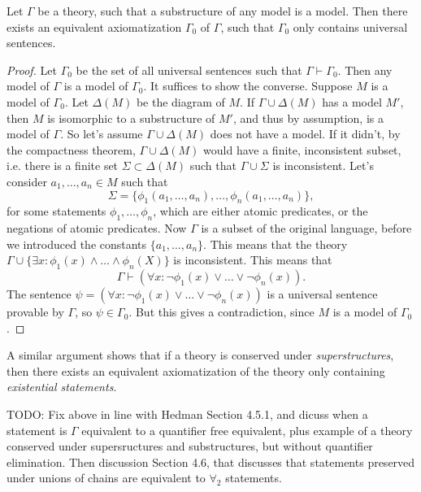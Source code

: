 \begin{theorem}
    Let $\Gamma$ be a theory, such that a substructure of any model is a model. Then there exists an equivalent axiomatization $\Gamma_0$ of $\Gamma$, such that $\Gamma_0$ only contains universal sentences.
\end{theorem}
\begin{proof}
    Let $\Gamma_0$ be the set of all universal sentences such that $\Gamma \vdash \Gamma_0$. Then any model of $\Gamma$ is a model of $\Gamma_0$. It suffices to show the converse. Suppose $M$ is a model of $\Gamma_0$. Let $\Delta(M)$ be the diagram of $M$. If $\Gamma \cup \Delta(M)$ has a model $M'$, then $M$ is isomorphic to a substructure of $M'$, and thus by assumption, is a model of $\Gamma$. So let's assume $\Gamma \cup \Delta(M)$ does not have a model. If it didn't, by the compactness theorem, $\Gamma \cup \Delta(M)$ would have a finite, inconsistent subset, i.e. there is a finite set $\Sigma \subset \Delta(M)$ such that $\Gamma \cup \Sigma$ is inconsistent. Let's consider $a_1,\dots,a_n \in M$ such that
    \[ \Sigma = \{ \phi_1(a_1,\dots,a_n), \dots, \phi_n(a_1,\dots,a_n) \}, \]
    for some statements $\phi_1,\dots,\phi_n$, which are either atomic predicates, or the negations of atomic predicates. Now $\Gamma$ is a subset of the original language, before we introduced the constants $\{ a_1, \dots, a_n \}$. This means that the theory $\Gamma \cup \{ \exists x: \phi_1(x) \wedge \dots \wedge \phi_n(X) \}$ is inconsistent. This means that
    \[ \Gamma \vdash (\forall x: \neg \phi_1(x) \vee \dots \vee \neg \phi_n(x)). \]
    The sentence $\psi = (\forall x: \neg \phi_1(x) \vee \dots \vee \neg \phi_n(x))$ is a universal sentence provable by $\Gamma$, so $\psi \in \Gamma_0$. But this gives a contradiction, since $M$ is a model of $\Gamma_0$.
\end{proof}

A similar argument shows that if a theory is conserved under \emph{superstructures}, then there exists an equivalent axiomatization of the theory only containing \emph{existential statements}.

TODO: Fix above in line with Hedman Section 4.5.1, and dicuss when a statement is $\Gamma$ equivalent to a quantifier free equivalent, plus example of a theory conserved under supersructures and substructures, but without quantifier elimination. Then discussion Section 4.6, that discusses that statements preserved under unions of chains are equivalent to $\forall_2$ statements.


